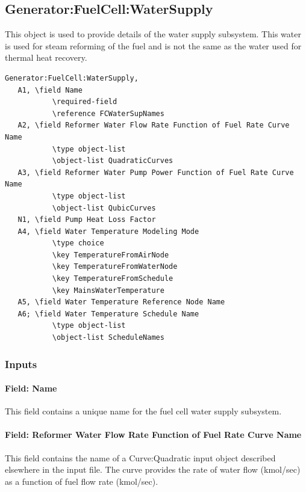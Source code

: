 \subsection{Generator:FuelCell:WaterSupply}\label{generatorfuelcellwatersupply}

This object is used to provide details of the water supply subsystem. This water is used for steam reforming of the fuel and is not the same as the water used for thermal heat recovery.

\begin{lstlisting}
Generator:FuelCell:WaterSupply,
   A1, \field Name
           \required-field
           \reference FCWaterSupNames
   A2, \field Reformer Water Flow Rate Function of Fuel Rate Curve Name
           \type object-list
           \object-list QuadraticCurves
   A3, \field Reformer Water Pump Power Function of Fuel Rate Curve Name
           \type object-list
           \object-list QubicCurves
   N1, \field Pump Heat Loss Factor
   A4, \field Water Temperature Modeling Mode
           \type choice
           \key TemperatureFromAirNode
           \key TemperatureFromWaterNode
           \key TemperatureFromSchedule
           \key MainsWaterTemperature
   A5, \field Water Temperature Reference Node Name
   A6; \field Water Temperature Schedule Name
           \type object-list
           \object-list ScheduleNames
\end{lstlisting}

\subsubsection{Inputs}\label{inputs-15-003}

\paragraph{Field: Name}\label{field-name-17-000}

This field contains a unique name for the fuel cell water supply subsystem.

\paragraph{Field: Reformer Water Flow Rate Function of Fuel Rate Curve Name}\label{field-reformer-water-flow-rate-function-of-fuel-rate-curve-name}

This field contains the name of a Curve:Quadratic input object described elsewhere in the input file. The curve provides the rate of water flow (kmol/sec) as a function of fuel flow rate (kmol/sec).

